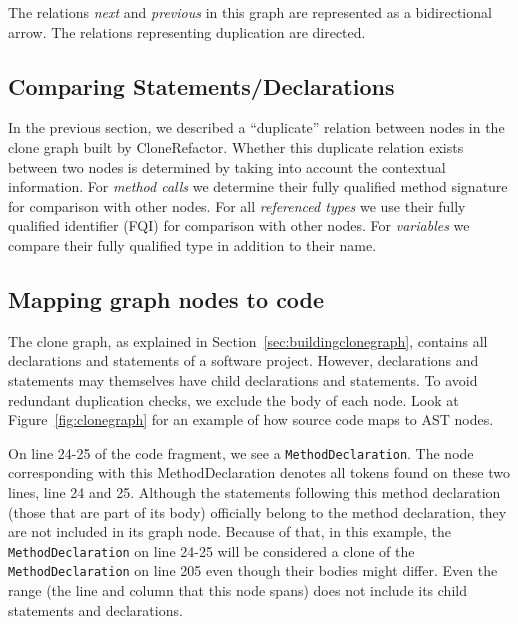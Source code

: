 \documentclass[conference]{IEEEtran}
\begin{document}

The relations \textit{next} and \textit{previous} in this graph are represented as a bidirectional arrow. The relations representing duplication are directed. %

\subsection{Comparing Statements/Declarations} \label{sec:comparingstuff}
In the previous section, we described a ``duplicate'' relation between nodes in the clone graph built by CloneRefactor. Whether this duplicate relation exists between two nodes is determined by taking into account the contextual information. For \textit{method calls} we determine their fully qualified method signature for comparison with other nodes. For all \textit{referenced types} we use their fully qualified identifier (FQI) for comparison with other nodes. For \textit{variables} we compare their fully qualified type in addition to their name.

\subsection{Mapping graph nodes to code}
The clone graph, as explained in Section~\ref{sec:buildingclonegraph}, contains all declarations and statements of a software project. However, declarations and statements may themselves have child declarations and statements. To avoid redundant duplication checks, we exclude the body of each node. Look at Figure~\ref{fig:clonegraph} for an example of how source code maps to AST nodes.

On line 24-25 of the code fragment, we see a \texttt{MethodDeclaration}. The node corresponding with this MethodDeclaration denotes all tokens found on these two lines, line 24 and 25. Although the statements following this method declaration (those that are part of its body) officially belong to the method declaration, they are not included in its graph node. Because of that, in this example, the \texttt{MethodDeclaration} on line 24-25 will be considered a clone of the \texttt{MethodDeclaration} on line 205 even though their bodies might differ. Even the range (the line and column that this node spans) does not include its child statements and declarations.
\end{document}

